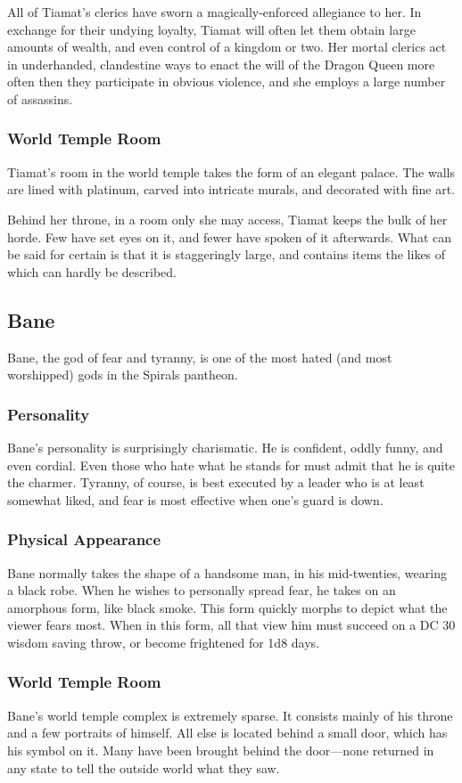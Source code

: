 All of Tiamat's clerics have sworn a magically-enforced allegiance to her.
In exchange for their undying loyalty, Tiamat will often let them obtain large amounts of wealth, and even control of a kingdom or two.
Her mortal clerics act in underhanded, clandestine ways to enact the will of the Dragon Queen more often then they participate in obvious violence, and she employs a large number of assassins.

\subsubsection*{World Temple Room}
Tiamat's room in the world temple takes the form of an elegant palace.
The walls are lined with platinum, carved into intricate murals, and decorated with fine art.

Behind her throne, in a room only she may access, Tiamat keeps the bulk of her horde.
Few have set eyes on it, and fewer have spoken of it afterwards.
What can be said for certain is that it is staggeringly large, and contains items the likes of which can hardly be described.

\subsection*{Bane}
\begin{goddesc}
\end{goddesc}
Bane, the god of fear and tyranny, is one of the most hated (and most worshipped) gods in the Spirals pantheon.

\subsubsection*{Personality}
Bane's personality is surprisingly charismatic.
He is confident, oddly funny, and even cordial.
Even those who hate what he stands for must admit that he is quite the charmer.
Tyranny, of course, is best executed by a leader who is at least somewhat liked, and fear is most effective when one's guard is down.

\subsubsection*{Physical Appearance}
Bane normally takes the shape of a handsome man, in his mid-twenties, wearing a black robe.
When he wishes to personally spread fear, he takes on an amorphous form, like black smoke.
This form quickly morphs to depict what the viewer fears most.
When in this form, all that view him must succeed on a DC 30 wisdom saving throw, or become frightened for 1d8 days.

\subsubsection*{World Temple Room}
Bane's world temple complex is extremely sparse.
It consists mainly of his throne and a few portraits of himself.
All else is located behind a small door, which has his symbol on it.
Many have been brought behind the door---none returned in any state to tell the outside world what they saw.